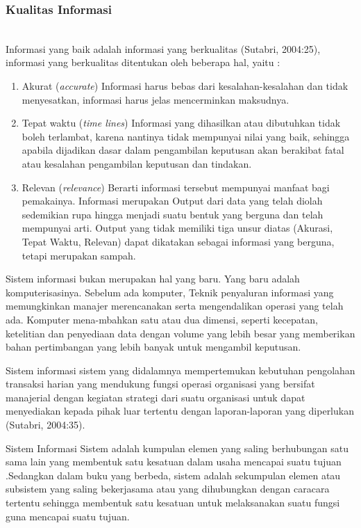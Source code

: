 \subsubsection{Kualitas Informasi}
\hfill\\
Informasi yang baik adalah informasi yang berkualitas (Sutabri, 2004:25), informasi yang berkualitas ditentukan oleh beberapa hal, yaitu :
\begin{enumerate}
	\item Akurat (\textit{accurate}) 
Informasi harus bebas dari kesalahan-kesalahan dan tidak menyesatkan, informasi harus jelas mencerminkan maksudnya.

	\item Tepat waktu (\textit{time lines})
Informasi yang dihasilkan atau dibutuhkan tidak boleh terlambat, karena nantinya tidak mempunyai nilai yang baik, sehingga apabila dijadikan dasar dalam pengambilan keputusan akan berakibat fatal atau kesalahan pengambilan keputusan dan tindakan.
	
	\item Relevan (\textit{relevance})
Berarti informasi tersebut mempunyai manfaat bagi pemakainya. Informasi merupakan Output dari data yang telah diolah sedemikian rupa hingga menjadi suatu bentuk yang berguna dan telah mempunyai arti. Output yang tidak memiliki tiga unsur diatas (Akurasi, Tepat Waktu, Relevan) dapat dikatakan sebagai informasi yang berguna, tetapi merupakan sampah.

\end{enumerate}

Sistem informasi bukan merupakan hal yang baru. Yang baru adalah komputerisasinya. Sebelum ada komputer, Teknik penyaluran informasi yang memungkinkan manajer merencanakan serta mengendalikan operasi yang telah ada. Komputer mena-mbahkan satu atau dua dimensi, seperti kecepatan, ketelitian dan penyediaan data dengan volume yang lebih besar yang memberikan bahan pertimbangan yang lebih banyak untuk mengambil keputusan.

Sistem informasi sistem yang didalamnya mempertemukan kebutuhan pengolahan transaksi harian yang mendukung fungsi operasi organisasi yang bersifat manajerial dengan kegiatan strategi dari suatu organisasi untuk dapat menyediakan kepada pihak luar tertentu dengan laporan-laporan yang diperlukan (Sutabri, 2004:35).
 
Sistem Informasi Sistem adalah kumpulan elemen yang saling berhubungan satu sama lain yang membentuk satu kesatuan dalam usaha mencapai suatu tujuan .Sedangkan dalam buku yang berbeda, sistem adalah sekumpulan elemen atau subsistem yang saling bekerjasama atau yang dihubungkan dengan caracara tertentu sehingga membentuk satu kesatuan untuk melaksanakan suatu fungsi guna mencapai suatu tujuan. 

